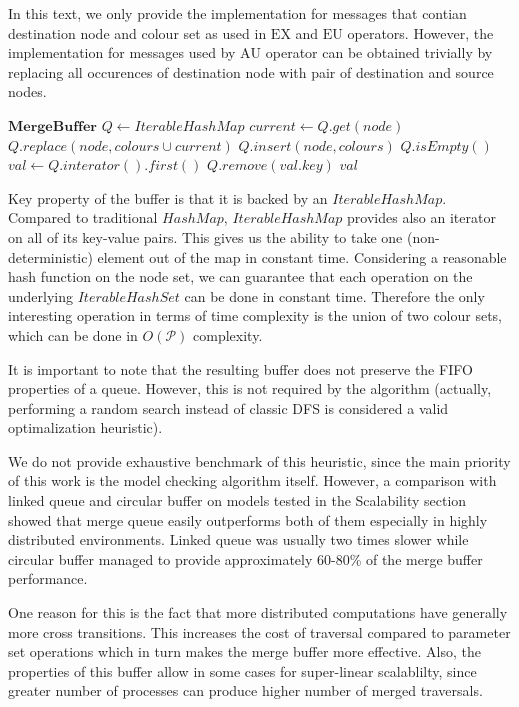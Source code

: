 \documentclass[12pt,oneside, draft]{fithesis2}
\newcommand{\params}{\mathcal{P}}
\newcommand{\eu}[2]{\ensuremath{\mbox{E} #1 \mbox{U} #2 }}
\newcommand{\au}[2]{\ensuremath{\mbox{A} #1 \mbox{U} #2 }}
\newcommand{\ex}[1]{\ensuremath{\mbox{EX} #1}}
\begin{document}
			In this text, we only provide the implementation for messages that contian destination node and colour set as used in $\ex{}$ and $\eu{}{}$ operators. However, the implementation for messages used by $\au{}{}$ operator can be obtained trivially by replacing all occurences of destination node with pair of destination and source nodes.
			
			\begin{algorithmic}[1]
			\State $ \textbf{MergeBuffer} $
			\State $ Q \gets IterableHashMap $
					\State $current \gets Q.get(node)$
					\State $Q.replace(node, colours \cup current)$
				\Else
					\State $Q.insert(node, colours)$				
				\EndIf
			\EndProcedure
				\State \Return $Q.isEmpty()$
			\EndProcedure
				\State $val \gets Q.interator().first()$
				\State $Q.remove(val.key)$
				\State \Return $val$
			\EndProcedure
			\end{algorithmic}				
			
			Key property of the buffer is that it is backed by an $IterableHashMap$. Compared to traditional $HashMap$, $IterableHashMap$ provides also an iterator on all of its key-value pairs. This gives us the ability to take one (non-deterministic) element out of the map in constant time. Considering a reasonable hash function on the node set, we can guarantee that each operation on the underlying $IterableHashSet$ can be done in constant time. Therefore the only interesting operation in terms of time complexity is the union of two colour sets, which can be done in $O(\params)$ complexity.
			
			It is important to note that the resulting buffer does not preserve the FIFO properties of a queue. However, this is not required by the algorithm (actually, performing a random search instead of classic DFS is considered a valid optimalization heuristic).
			
			We do not provide exhaustive benchmark of this heuristic, since the main priority of this work is the model checking algorithm itself. However, a comparison with linked queue and circular buffer on models tested in the Scalability section showed that merge queue easily outperforms both of them especially in highly distributed environments. Linked queue was usually two times slower while circular buffer managed to provide approximately 60-80\% of the merge buffer performance. 
			
			One reason for this is the fact that more distributed computations have generally more cross transitions. This increases the cost of traversal compared to parameter set operations which in turn makes the merge buffer more effective. Also, the properties of this buffer allow in some cases for super-linear scalablilty, since greater number of processes can produce higher number of merged traversals. 			
	
\end{document}
